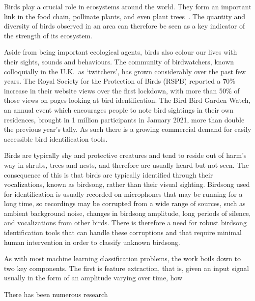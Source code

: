 Birds play a crucial role in ecosystems around the world. They form an important
link in the food chain, pollinate plants, and even plant
trees~\cite{broughton2021long}. The quantity and diversity of birds observed in
an area can therefore be seen as a key indicator of the strength of its
ecosystem.

Aside from being important ecological agents, birds also colour our lives with
their sights, sounds and behaviours. The community of birdwatchers, known
colloquially in the U.K.~as `twitchers', has grown considerably over the past
few years. The Royal Society for the Protection of Birds (RSPB) reported a 70\%
increase in their website views over the first lockdown, with more than 50\% of
those views on pages looking at bird identification. The Bird Bird Garden Watch,
an annual event which encourages people to note bird sightings in their own
residences, brought in 1 million participants in January 2021, more than double
the previous year's tally. As such there is a growing commercial demand for
easily accessible bird identification tools.

Birds are typically shy and protective creatures and tend to reside out of
harm's way in shrubs, trees and nests, and therefore are usually heard but not
seen. The consequence of this is that birds are typically identified through
their vocalizations, known as birdsong, rather than their visual sighting.
Birdsong used for identification is usually recorded on microphones that may be
running for a long time, so recordings may be corrupted from a wide range of
sources, such as ambient background noise, changes in birdsong amplitude, long
periods of silence, and vocalizations from other birds. There is therefore a
need for robust birdsong identification tools that can handle these corruptions
and that require minimal human intervention in order to classify unknown
birdsong.

As with most machine learning classification problems, the work boils down to
two key components. The first is feature extraction, that is, given an input
signal usually in the form of an amplitude varying over time, how

There has been numerous research 
